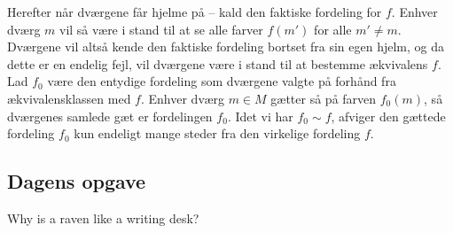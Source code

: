 \begin{minipage}[t]{100mm}
Herefter når dværgene får hjelme på -- kald den faktiske fordeling for $f$. Enhver dværg $m$ vil så være i stand til at se alle farver $f(m')$ for alle $m'\neq m$. Dværgene vil altså kende den faktiske fordeling bortset fra sin egen hjelm, og da dette er en endelig fejl, vil dværgene være i stand til at bestemme ækvivalens $f$. Lad $f_0$ være den entydige fordeling som dværgene valgte på forhånd fra ækvivalensklassen med $f$. Enhver dværg $m\in M$ gætter så på farven $f_0(m)$, så dværgenes samlede gæt er fordelingen $f_0$. Idet vi har $f_0\sim f$, afviger den gættede fordeling $f_0$ kun endeligt mange steder fra den virkelige fordeling $f$.

\begin{center}
\section*{Dagens opgave}
Why is a raven like a writing desk?
\end{center}

\end{minipage}

